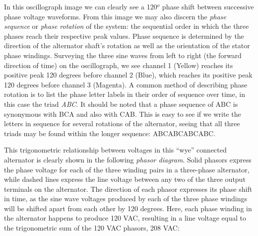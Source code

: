 In this oscillograph image we can clearly see a 120$^{o}$ phase shift between successive phase voltage waveforms.  From this image we may also discern the \textit{phase sequence} or \textit{phase rotation} of the system: the sequential order in which the three phases reach their respective peak values.  Phase sequence is determined by the direction of the alternator shaft's rotation as well as the orientation of the stator phase windings.  Surveying the three sine waves from left to right (the forward direction of time) on the oscillograph, we see channel 1 (Yellow) reaches its positive peak 120 degrees before channel 2 (Blue), which reaches its positive peak 120 degrees before channel 3 (Magenta).  A common method of describing phase rotation is to list the phase letter labels in their order of sequence over time, in this case the triad \textit{ABC}.  It should be noted that a phase sequence of ABC is synonymous with BCA and also with CAB.  This is easy to see if we write the letters in sequence for several rotations of the alternator, seeing that all three triads may be found within the longer sequence: ABCABCABCABC.    











\filbreak

This trigonometric relationship between voltages in this ``wye'' connected alternator is clearly shown in the following \textit{phasor diagram}.  Solid phasors express the phase voltage for each of the three winding pairs in a three-phase alternator, while dashed lines express the line voltage between any two of the three output terminals on the alternator.  The direction of each phasor expresses its phase shift in time, as the sine wave voltages produced by each of the three phase windings will be shifted apart from each other by 120 degrees.  Here, each phase winding in the alternator happens to produce 120 VAC, resulting in a line voltage equal to the trigonometric sum of the 120 VAC phasors, 208 VAC:  

